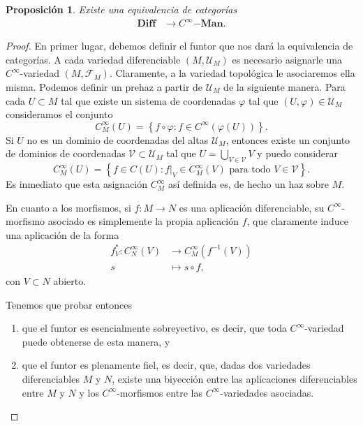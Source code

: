 \documentclass[12pt,a4paper]{book}
\newtheorem{prop}[thm]{Proposición}
\theoremstyle{definition} \newtheorem{defn}[thm]{Definición}
\theoremstyle{definition} \newtheorem{ejemplo}[thm]{Ejemplo}
\theoremstyle{definition} \newtheorem{ejercicio}[thm]{Ejercicio}
\theoremstyle{remark} \newtheorem*{obs}{Observación}
\begin{document}
	  \begin{prop}
	    Existe una equivalencia de categorías 
	    \begin{align*}
	      \mathbf{Diff}&\longrightarrow C^{\infty}\mathbf{-Man}.
	      \end{align*}
	  \end{prop}

	  \begin{proof}
	    En primer lugar, debemos definir el funtor que nos dará la equivalencia de categorías. A cada variedad diferenciable $(M,\mathcal{U}_M)$ es necesario asignarle una $C^\infty$-variedad $(M,\mathscr{F}_M)$. Claramente, a la variedad topológica le asociaremos ella misma. Podemos definir un prehaz a partir de $\mathcal{U}_M$ de la siguiente manera. Para cada $U\subset M$ tal que existe un sistema de coordenadas $\varphi$ tal que $(U,\varphi)\in \mathcal{U}_M$ consideramos el conjunto
	    \begin{equation*}
	      C^\infty_M (U) = \left\{ f \circ \varphi : f \in C^{\infty}(\varphi(U))  \right\}.
	    \end{equation*}
	    Si $U$ no es un dominio de coordenadas del altas $\mathcal{U}_M$, entonces existe un conjunto de dominios de coordenadas $\mathcal{V}\subset \mathcal{U}_M$ tal que $U=\bigcup_{V\in \mathcal{V}} V$ y puedo considerar
	    \begin{equation*}
	      C^\infty_M (U) = \left\{f \in C(U) : f|_{V} \in C^\infty_M(V) \text{ para todo } V\in \mathcal{V}  \right\}.
	    \end{equation*}
	    Es inmediato que esta asignación $C^\infty_M$ así definida es, de hecho un haz sobre $M$.

	    En cuanto a los morfismos, si $f:M \rightarrow N$ es una aplicación diferenciable, su $C^\infty$-morfismo asociado es simplemente la propia aplicación $f$, que claramente induce una aplicación de la forma
	      \begin{align*}
		f^*_V : C^\infty_N(V) &\longrightarrow C^\infty_M(f^{-1}(V)) \\ 
		  s &\longmapsto s\circ f, 
		\end{align*}
		con $V\subset N$ abierto.

		Tenemos que probar entonces
		\begin{enumerate}
		  \item que el funtor es esencialmente sobreyectivo, es decir, que toda $C^\infty$-variedad puede obtenerse de esta manera, y
		  \item que el funtor es plenamente fiel, es decir, que, dadas dos variedades diferenciables $M$ y $N$, existe una biyección entre las aplicaciones diferenciables entre $M$ y $N$ y los $C^\infty$-morfismos entre las $C^\infty$-variedades asociadas.
		\end{enumerate}


\end{proof}
\end{document}
